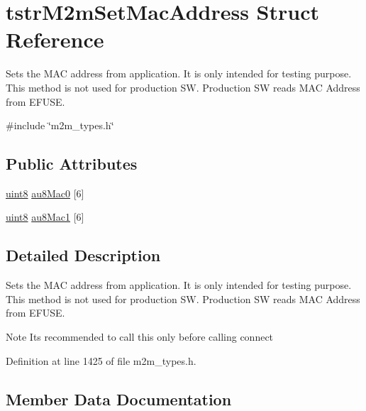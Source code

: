 \hypertarget{structtstrM2mSetMacAddress}{}\section{tstr\+M2m\+Set\+Mac\+Address Struct Reference}
\label{structtstrM2mSetMacAddress}


Sets the M\+AC address from application. It is only intended for testing purpose. This method is not used for production SW. Production SW reads M\+AC Address from E\+F\+U\+SE.  




{\ttfamily \#include \char`\"{}m2m\+\_\+types.\+h\char`\"{}}

\subsection*{Public Attributes}
\begin{DoxyCompactItemize}
\item 
\hyperlink{group__DataT_ga4df709a77647e870bbf1d955b8edc9a6}{uint8} \hyperlink{structtstrM2mSetMacAddress_acfbc3a49676b607a38ac12c3e16af4ad}{au8\+Mac0} \mbox{[}6\mbox{]}
\item 
\hyperlink{group__DataT_ga4df709a77647e870bbf1d955b8edc9a6}{uint8} \hyperlink{structtstrM2mSetMacAddress_a3f409e492cbbee5518c4f80608776ec6}{au8\+Mac1} \mbox{[}6\mbox{]}
\end{DoxyCompactItemize}


\subsection{Detailed Description}
Sets the M\+AC address from application. It is only intended for testing purpose. This method is not used for production SW. Production SW reads M\+AC Address from E\+F\+U\+SE. 

\begin{DoxyNote}{Note}
It\textquotesingle{}s recommended to call this only before calling connect 
\end{DoxyNote}


Definition at line 1425 of file m2m\+\_\+types.\+h.



\subsection{Member Data Documentation}
\mbox{\label{structtstrM2mSetMacAddress_acfbc3a49676b607a38ac12c3e16af4ad}} 
